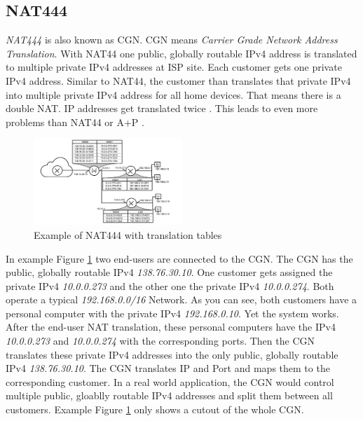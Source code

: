 \documentclass[format=sigconf, natbib=true, nonacm=true]{acmart}
\begin{document}
    \subsection{NAT444}
    \textit{NAT444} is also known as CGN. CGN means \textit{Carrier Grade Network Address Translation}. With NAT44 one public, globally routable IPv4 address is translated to multiple private IPv4 addresses at ISP site. Each customer gets one private IPv4 address. Similar to NAT44, the customer than translates that private IPv4 into multiple private IPv4 address for all home devices. That means there is a double NAT. IP addresses get translated twice \cite{10.1145/2987443.2987474}. This leads to even more problems than NAT44 or A+P \cite{8716482}.
    \begin{figure}
        \centering
        \includegraphics[width=0.5\textwidth]{images/nat_444.png}
        \caption{Example of NAT444 with translation tables}
        \label{fig:nat_444}
    \end{figure}
    In example Figure \ref{fig:nat_444} two end-users are connected to the CGN. The CGN has the public, globally routable IPv4 \textit{138.76.30.10}. One customer gets assigned the private IPv4 \textit{10.0.0.273} and the other one the private IPv4 \textit{10.0.0.274}. Both operate a typical \textit{192.168.0.0/16} Network. As you can see, both customers have a personal computer with the private IPv4 \textit{192.168.0.10}. Yet the system works. After the end-user NAT translation, these personal computers have the IPv4 \textit{10.0.0.273} and \textit{10.0.0.274} with the corresponding ports. Then the CGN translates these private IPv4 addresses into the only public, globally routable IPv4 \textit{138.76.30.10}. The CGN translates IP and Port and maps them to the corresponding customer. In a real world application, the CGN would control multiple public, gloablly routable IPv4 addresses and split them between all customers. Example Figure \ref{fig:nat_444} only shows a cutout of the whole CGN\cite{Hughes2022_C11}.
\end{document}
